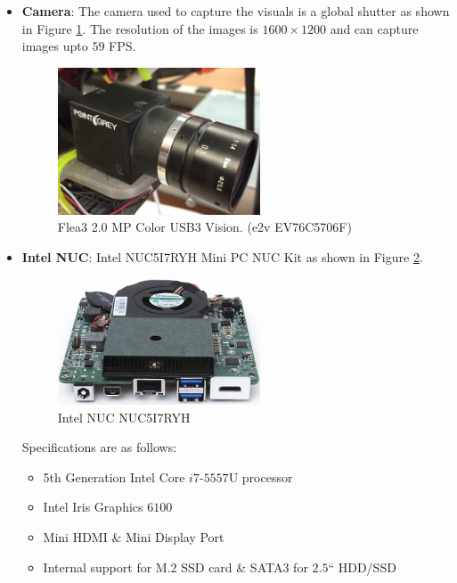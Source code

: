 \documentclass[12pt]{report}
\begin{document}
\begin{itemize}
\item \textbf{Camera}: The camera used to capture the visuals is a global shutter \cite{fleacamera} as shown in Figure \ref{fig:cam}. The resolution of the images is $1600 \times 1200$ and can capture images upto $59$ FPS.
\begin{figure}[H]
	\centering 
    \includegraphics[width=6cm]{cam.jpg}
	\caption{Flea3 2.0 MP Color USB3 Vision. (e2v EV76C5706F)}
   \label{fig:cam}
\end{figure}

\item \textbf{Intel NUC}: Intel NUC5I7RYH Mini PC NUC Kit as shown in Figure \ref{fig:nuc}. 
\begin{figure}[H]
	\centering 
    \includegraphics[width=6cm]{nuc.jpg}
	\caption{Intel NUC NUC5I7RYH}
   \label{fig:nuc}
\end{figure}
Specifications are as follows:
\begin {itemize}
\item 5th Generation Intel Core $i7$-$5557$U processor
\item Intel Iris Graphics $6100$
\item Mini HDMI \& Mini Display Port
\item Internal support for M.$2$ SSD card \& SATA$3$ for $2.5$`` HDD/SSD
\end{itemize}


\end{itemize}
\end{document}
